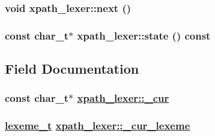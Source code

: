 \hypertarget{classxpath__lexer_32684b3097fccb4d626da620b44b72ad}{
\subsubsection[next]{\setlength{\rightskip}{0pt plus 5cm}void xpath\_\-lexer::next ()}}
\label{classxpath__lexer_32684b3097fccb4d626da620b44b72ad}


\hypertarget{classxpath__lexer_3794e29f3bec2fa31346766eea978cbf}{
\subsubsection[state]{\setlength{\rightskip}{0pt plus 5cm}const char\_\-t$\ast$ xpath\_\-lexer::state () const}}
\label{classxpath__lexer_3794e29f3bec2fa31346766eea978cbf}




\subsection{Field Documentation}
\hypertarget{classxpath__lexer_f1c8627ba8f2522ce4bd81dce1899f52}{
\subsubsection[\_\-cur]{\setlength{\rightskip}{0pt plus 5cm}const char\_\-t$\ast$ \hyperlink{classxpath__lexer_f1c8627ba8f2522ce4bd81dce1899f52}{xpath\_\-lexer::\_\-cur}}}
\label{classxpath__lexer_f1c8627ba8f2522ce4bd81dce1899f52}


\hypertarget{classxpath__lexer_29b63ce861f781e1aa00763ad1dcb6cf}{
\subsubsection[\_\-cur\_\-lexeme]{\setlength{\rightskip}{0pt plus 5cm}\hyperlink{pugixml_8cpp_1fdd6d0a63acbba1491ab331ddce4ac9}{lexeme\_\-t} \hyperlink{classxpath__lexer_29b63ce861f781e1aa00763ad1dcb6cf}{xpath\_\-lexer::\_\-cur\_\-lexeme}}}
\label{classxpath__lexer_29b63ce861f781e1aa00763ad1dcb6cf}


